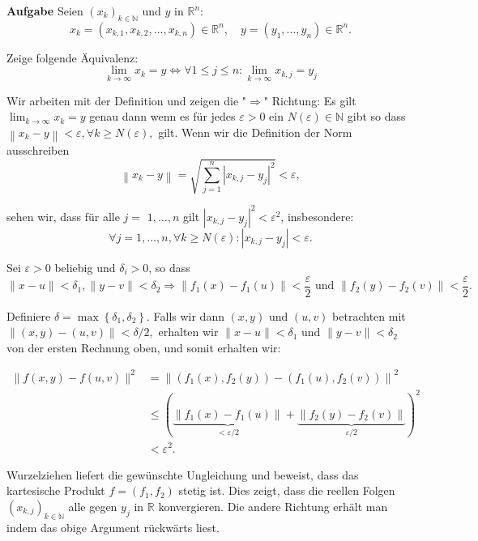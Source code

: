 \hrulefill

\textbf{Aufgabe} Seien $\left(x_{k}\right)_{k \in \mathbb{N}}$ und $y$ in $\mathbb{R}^{n}$:
$$
x_{k}=\left(x_{k, 1}, x_{k, 2}, \ldots, x_{k, n}\right) \in \mathbb{R}^{n}, \quad y=\left(y_{1}, \ldots, y_{n}\right) \in \mathbb{R}^{n} .
$$

Zeige folgende Äquivalenz:
$$
\lim _{k \rightarrow \infty} x_{k}=y \Longleftrightarrow \forall 1 \leq j \leq n: \lim _{k \rightarrow \infty} x_{k, j}=y_{j}
$$

Wir arbeiten mit der Definition und zeigen die "$\Rightarrow$" Richtung: Es gilt 
$\lim _{k \rightarrow \infty} x_{k}=y$ genau dann wenn es für jedes $\varepsilon>0$ 
ein $N(\varepsilon) \in \mathbb{N}$ gibt so dass $\left\|x_{k}-y\right\|<\varepsilon,
\forall k \geq N(\varepsilon),$ gilt. Wenn wir die Definition der Norm ausschreiben
$$
\left\|x_{k}-y\right\|=\sqrt{\sum_{j=1}^{n}\left|x_{k, j}-y_{j}\right|^{2}}<\varepsilon,
$$

sehen wir, dass für alle $j=$ $1, \ldots, n$ gilt $\left|x_{k,j}-y_{j}\right|^{2}<\varepsilon^{2}$,
insbesondere:
$$
\forall j=1, \ldots, n, \forall k \geq N(\varepsilon):\left|x_{k, j}-y_{j}\right|<\varepsilon .
$$

Sei $\varepsilon>0$ beliebig und $\delta_{i}>0$, so dass
$$
\|x-u\|<\delta_{1},\|y-v\|<\delta_{2} \Rightarrow \left\|f_{1}(x)-f_{1}(u)\right\|< 
\frac{\varepsilon}{2} \text { und }\left\|f_{2}(y)-f_{2}(v)\right\|< \frac{\varepsilon}{2} .
$$

Definiere $\delta=\max \left\{\delta_{1}, \delta_{2}\right\}$. Falls wir dann $(x, y)$ und $(u, v)$
betrachten mit $\|(x, y)-(u, v)\|<\delta / 2,$ erhalten wir $\|x-u\|<\delta_{1}$ und $\|y-v\|<\delta_{2}$ von der ersten Rechnung oben, und somit erhalten wir:

$$
\begin{aligned}
\|f(x, y)-f(u, v)\|^{2} &=\left\|\left(f_{1}(x), f_{2}(y)\right)-\left(f_{1}(u), f_{2}(v)\right)\right\|^{2} \\
& \leq(\underbrace{\left\|f_{1}(x)-f_{1}(u)\right\|}_{<\varepsilon / 2}+\underbrace{\left\|f_{2}(y)-f_{2}(v)\right\|}_{\varepsilon / 2})^{2} \\
&<\varepsilon^{2} .
\end{aligned}
$$

Wurzelziehen liefert die gewünschte Ungleichung und beweist, dass das kartesische Produkt
$f=\left(f_{1}, f_{2}\right)$ stetig ist. Dies zeigt, dass die reellen Folgen $\left(x_{k,
j}\right)_{k \in \mathbb{N}}$ alle gegen $y_{j}$ in $\mathbb{R}$ konvergieren. Die andere Richtung
erhält man indem das obige Argument rückwärts liest.

